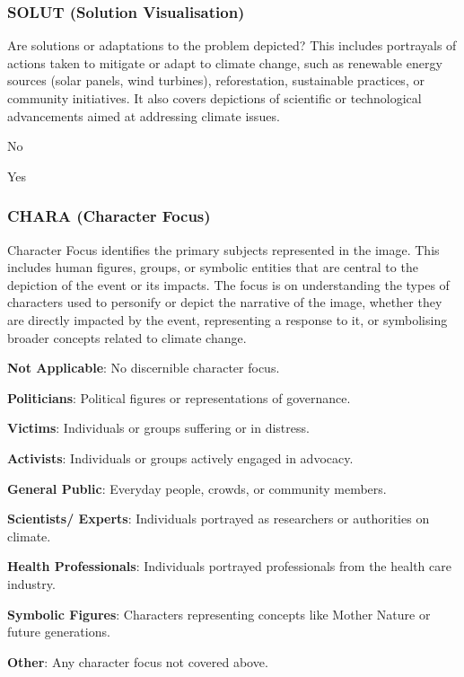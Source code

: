 \subsubsection*{SOLUT (Solution Visualisation)}
\label{subsubsec:solution-visualisation}
Are solutions or adaptations to the problem depicted? This includes portrayals of actions taken to mitigate or adapt to climate change, such as renewable energy sources (solar panels, wind turbines), reforestation, sustainable practices, or community initiatives. It also covers depictions of scientific or technological advancements aimed at addressing climate issues.

\begin{description}[leftmargin=2.5cm, style=multiline, labelwidth=1.5cm]
\item[0] No
\item[1] Yes
\end{description}

\subsubsection*{CHARA (Character Focus)}
\label{subsubsec:character-focus}
Character Focus identifies the primary subjects represented in the image. This includes human figures, groups, or symbolic entities that are central to the depiction of the event or its impacts. The focus is on understanding the types of characters used to personify or depict the narrative of the image, whether they are directly impacted by the event, representing a response to it, or symbolising broader concepts related to climate change. 

\begin{description}[leftmargin=2.5cm, style=multiline, labelwidth=1.5cm]
\item[0] \textbf{Not Applicable}: No discernible character focus.
\item[1] \textbf{Politicians}: Political figures or representations of governance.
\item[2] \textbf{Victims}: Individuals or groups suffering or in distress.
\item[3] \textbf{Activists}: Individuals or groups actively engaged in advocacy.
\item[4] \textbf{General Public}: Everyday people, crowds, or community members.
\item[5] \textbf{Scientists/ Experts}: Individuals portrayed as researchers or authorities on climate.
\item[6] \textbf{Health Professionals}: Individuals portrayed professionals from the health care industry.
\item[7] \textbf{Symbolic Figures}: Characters representing concepts like Mother Nature or future generations.
\item[8] \textbf{Other}: Any character focus not covered above.
\end{description}

